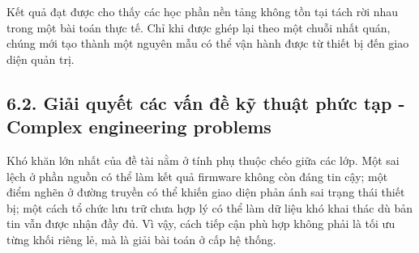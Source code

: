 \documentclass[a4paper]{extarticle}
\begin{document}
Kết quả đạt được cho thấy các học phần nền tảng không tồn tại tách rời nhau trong
một bài toán thực tế. Chỉ khi được ghép lại theo một chuỗi nhất quán, chúng mới
tạo thành một nguyên mẫu có thể vận hành được từ thiết bị đến giao diện quản trị.

\subsection{6.2. Giải quyết các vấn đề kỹ thuật phức tạp - Complex engineering problems}\label{giux1ea3i-quyux1ebft-cuxe1c-vux1ea5n-ux111ux1ec1-kux1ef9-thuux1eadt-phux1ee9c-tux1ea1p---complex-engineering-problems}

Khó khăn lớn nhất của đề tài nằm ở tính phụ thuộc chéo giữa các lớp. Một sai lệch
ở phần nguồn có thể làm kết quả firmware không còn đáng tin cậy; một điểm nghẽn
ở đường truyền có thể khiến giao diện phản ánh sai trạng thái thiết bị; một cách
tổ chức lưu trữ chưa hợp lý có thể làm dữ liệu khó khai thác dù bản tin vẫn được
nhận đầy đủ. Vì vậy, cách tiếp cận phù hợp không phải là tối ưu từng khối riêng
lẻ, mà là giải bài toán ở cấp hệ thống.
\end{document}
